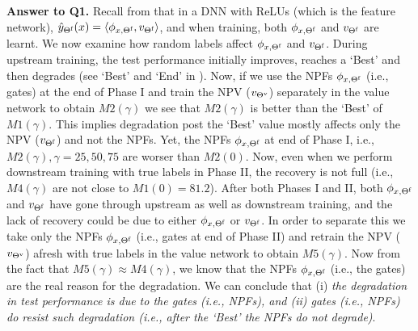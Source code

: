 \textbf{Answer to Q1.} Recall from  that in a DNN with ReLUs (which is the feature network), $\hat{y}_{\Theta^{\textrm{f}}}(x)=\langle \phi_{x,\Theta^{\textrm{f}}},v_{\Theta^{\textrm{f}}}\rangle$, and when training, both $\phi_{x,\Theta^{\textrm{f}}}$ and $v_{\Theta^{\textrm{f}}}$ are learnt. We now examine how random labels affect $\phi_{x,\Theta^{\textrm{f}}}$ and $v_{\Theta^{\textrm{f}}}$. During upstream training, the test performance initially improves, reaches a `Best' and then degrades (see `Best' and `End' in ). Now, if we use the NPFs $\phi_{x,\Theta^{\textrm{f}}}$ (i.e., gates) at the end of Phase I and train the NPV ($v_{{\Theta}^{\text{v}}}$) separately in the value network to obtain $M2(\gamma)$ we see that $M2(\gamma)$ is better than the `Best' of $M1(\gamma)$. This implies degradation post the `Best' value mostly affects only the NPV ($v_{\Theta^{\textrm{f}}}$) and not the NPFs. Yet, the NPFs $\phi_{x,\Theta^{\textrm{f}}}$ at end of Phase I, i.e., $M2(\gamma), \gamma=25,50,75$ are worser than $M2(0)$. Now, even when we perform downstream training with true labels in Phase II, the recovery is not full (i.e., $M4(\gamma)$ are not close to $M1(0)=81.2$). After both Phases I and II, both $\phi_{x,\Theta^{\textrm{f}}}$ and $v_{\Theta^{\textrm{f}}}$ have gone through upstream as well as downstream training, and the lack of recovery could be due to either $\phi_{x,\Theta^{\textrm{f}}}$  or $v_{\Theta^{\textrm{f}}}$. In order to separate this we take only the NPFs $\phi_{x,\Theta^{\textrm{f}}}$ (i.e., gates at end of Phase II) and retrain the NPV ($v_{{\Theta}^{\text{v}} }$) afresh with true labels in the value network to obtain $M5(\gamma)$. Now from the fact that $M5(\gamma) \approx M4(\gamma)$, we know that the NPFs $\phi_{x,\Theta^{\textrm{f}}}$ (i.e., the gates) are the real reason for the degradation. We can conclude that (i) \emph{the degradation in test performance is due to the gates (i.e., NPFs), and (ii) gates (i.e., NPFs) do resist such degradation (i.e., after the `Best' the NPFs do not degrade)}.

